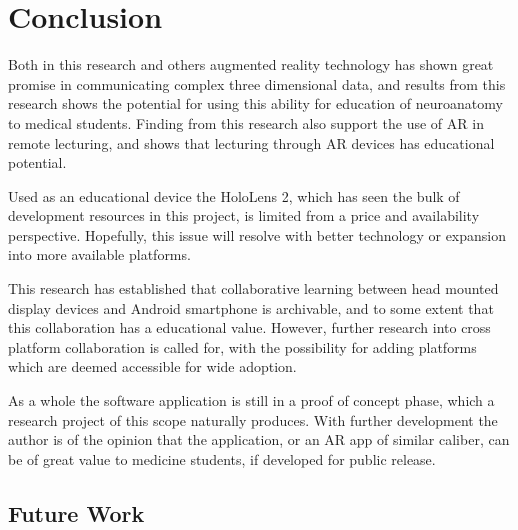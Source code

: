 \chapter{Conclusion}

Both in this research and others augmented reality technology has shown great promise in communicating complex three dimensional data, and results from this research shows the potential for using this ability for education of neuroanatomy to medical students. Finding from this research also support the use of AR in remote lecturing, and shows that lecturing through AR devices has educational potential.

Used as an educational device the HoloLens 2, which has seen the bulk of development resources in this project, is limited from a price and availability perspective. Hopefully, this issue will resolve with better technology or expansion into more available platforms.

This research has established that collaborative learning between head mounted display devices and Android smartphone is archivable, and to some extent that this collaboration has a educational value. However, further research into cross platform collaboration is called for, with the possibility for adding platforms which are deemed accessible for wide adoption.

As a whole the software application is still in a proof of concept phase, which a research project of this scope naturally produces. With further development the author is of the opinion that the application, or an AR app of similar caliber, can be of great value to medicine students, if developed for public release.




\section{Future Work}\label{chap:futurework}





